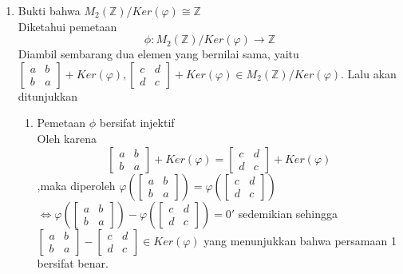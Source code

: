 \documentclass[12pt,A4paper]{article}
\begin{document}
\begin{enumerate}
\begin{enumerate}
\item Bukti bahwa $M_2(\mathbb{Z})/Ker(\varphi) \cong \mathbb{Z}$
\\  Diketahui pemetaan 
\[\phi :M_2(\mathbb{Z})/Ker(\varphi) \rightarrow \mathbb{Z} \]
Diambil sembarang dua elemen yang bernilai sama, yaitu $\begin{bmatrix}
	a & b\\
	b & a
\end{bmatrix} + Ker(\varphi),\begin{bmatrix}
c & d\\
d & c
\end{bmatrix} + Ker(\varphi)  \in M_2(\mathbb{Z})/Ker(\varphi)$. Lalu akan ditunjukkan
\begin{enumerate}
	\item Pemetaan $\phi$ bersifat injektif
	\\ Oleh karena 
	\begin{equation}\tag{1}\begin{bmatrix}
		a & b\\
		b & a
	\end{bmatrix} + Ker(\varphi) = \begin{bmatrix}
		c & d\\
		d & c
	\end{bmatrix} + Ker(\varphi)
\end{equation}
,maka diperoleh $\varphi \left(\begin{bmatrix}
	a & b\\
	b & a
\end{bmatrix}\right) = \varphi \left(\begin{bmatrix}
c & d\\
d & c
\end{bmatrix}\right)$ $\Leftrightarrow \varphi \left(\begin{bmatrix}
a & b\\
b & a
\end{bmatrix}\right) - \varphi \left(\begin{bmatrix}
c & d\\
d & c
\end{bmatrix}\right) = 0'$ sedemikian sehingga $\begin{bmatrix}
a & b\\
b & a
\end{bmatrix} -\begin{bmatrix}
c & d\\
d & c
\end{bmatrix} \in  Ker(\varphi)$ yang menunjukkan bahwa persamaan 1 bersifat benar. 

\end{enumerate}
\end{enumerate}
\end{enumerate}
\end{document}
